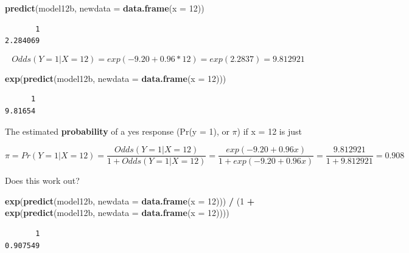 \documentclass[]{book}
\newenvironment{Shaded}{\begin{snugshade}}{\end{snugshade}}
\newcommand{\KeywordTok}[1]{\textcolor[rgb]{0.13,0.29,0.53}{\textbf{#1}}}
\newcommand{\DataTypeTok}[1]{\textcolor[rgb]{0.13,0.29,0.53}{#1}}
\newcommand{\DecValTok}[1]{\textcolor[rgb]{0.00,0.00,0.81}{#1}}
\newcommand{\StringTok}[1]{\textcolor[rgb]{0.31,0.60,0.02}{#1}}
\newcommand{\OperatorTok}[1]{\textcolor[rgb]{0.81,0.36,0.00}{\textbf{#1}}}
\newcommand{\NormalTok}[1]{#1}
\theoremstyle{definition}
\theoremstyle{definition}
\theoremstyle{definition}
\theoremstyle{remark}
\begin{document}
\begin{Shaded}
\begin{Highlighting}[]
\KeywordTok{predict}\NormalTok{(model12b, }\DataTypeTok{newdata =} \KeywordTok{data.frame}\NormalTok{(}\DataTypeTok{x =} \DecValTok{12}\NormalTok{))}
\end{Highlighting}
\end{Shaded}

\begin{verbatim}
       1 
2.284069 
\end{verbatim}

\[
Odds(Y = 1 | X = 12) = exp(-9.20 + 0.96 * 12) = exp(2.2837) = 9.812921
\]

\begin{Shaded}
\begin{Highlighting}[]
\KeywordTok{exp}\NormalTok{(}\KeywordTok{predict}\NormalTok{(model12b, }\DataTypeTok{newdata =} \KeywordTok{data.frame}\NormalTok{(}\DataTypeTok{x =} \DecValTok{12}\NormalTok{)))}
\end{Highlighting}
\end{Shaded}

\begin{verbatim}
      1 
9.81654 
\end{verbatim}

The estimated \textbf{probability} of a yes response (Pr(y = 1), or
\(\pi\)) if x = 12 is just

\[
\pi = Pr(Y = 1 | X = 12) = \frac{Odds(Y = 1 | X = 12)}{1 + Odds(Y = 1 | X = 12)} = \frac{exp(-9.20 + 0.96 x)}{1 + exp(-9.20 + 0.96 x)} = \frac{9.812921}{1 + 9.812921} = 0.908
\]

Does this work out?

\begin{Shaded}
\begin{Highlighting}[]
\KeywordTok{exp}\NormalTok{(}\KeywordTok{predict}\NormalTok{(model12b, }\DataTypeTok{newdata =} \KeywordTok{data.frame}\NormalTok{(}\DataTypeTok{x =} \DecValTok{12}\NormalTok{))) }\OperatorTok{/}\StringTok{ }
\StringTok{    }\NormalTok{(}\DecValTok{1} \OperatorTok{+}\StringTok{ }\KeywordTok{exp}\NormalTok{(}\KeywordTok{predict}\NormalTok{(model12b, }\DataTypeTok{newdata =} \KeywordTok{data.frame}\NormalTok{(}\DataTypeTok{x =} \DecValTok{12}\NormalTok{))))}
\end{Highlighting}
\end{Shaded}

\begin{verbatim}
       1 
0.907549 
\end{verbatim}
\end{document}
